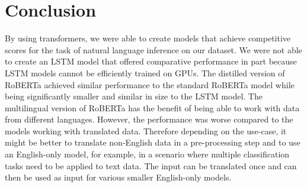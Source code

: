 \documentclass[acmsmall,nonacm]{acmart}
\begin{document}
\section{Conclusion}
By using transformers, we were able to create models that achieve competitive scores for the task of natural language inference on our dataset. We were not able to create an LSTM model that offered comparative performance in part because LSTM models cannot be efficiently trained on GPUs. The distilled version of RoBERTa achieved similar performance to the standard RoBERTa model while being significantly smaller and similar in size to the LSTM model. 
The multilingual version of RoBERTa has the benefit of being able to work with data from different languages. However, the performance was worse compared to the models working with translated data. Therefore depending on the use-case, it might be better to translate non-English data in a pre-processing step and to use an English-only model, for example, in a scenario where multiple classification tasks need to be applied to text data. The input can be translated once and can then be used as input for various smaller English-only models.


\pagebreak  



\end{document}
